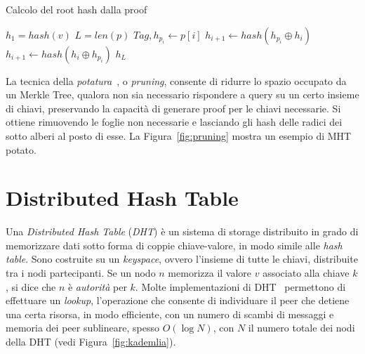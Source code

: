 \begin{algorithm}
	\caption{Calcolo del root hash dalla proof}
	\begin{algorithmic}
			\State $h_1 = hash(v)$
			\State $L = len(p)$
				\State $Tag, h_{p_i} \leftarrow p[i]$
					\State $h_{i+1} \leftarrow hash(h_{p_i} \oplus h_i)$	
				\Else
					\State $h_{i+1} \leftarrow hash(h_i \oplus h_{p_i})$				
				\EndIf
			\EndFor
			\Return $h_L$
		\EndProcedure
	\end{algorithmic}
	\label{alg:rh_proof}
\end{algorithm}

La tecnica della \emph{potatura}~\cite{ponnapalli2019scalable}, o \emph{pruning}, consente di ridurre lo spazio occupato da un Merkle Tree, qualora non sia necessario rispondere a query su un certo insieme di chiavi, preservando la capacità di generare proof per le chiavi necessarie. Si ottiene rimuovendo le foglie non necessarie e lasciando gli hash delle radici dei sotto alberi al posto di esse. La Figura~\ref{fig:pruning} mostra un esempio di MHT potato.

\section{Distributed Hash Table}

Una \textit{Distributed Hash Table} (\textit{DHT}) è un sistema di storage distribuito in grado di memorizzare dati sotto forma di coppie chiave-valore, in modo simile alle \emph{hash table}. Sono costruite su un \emph{keyspace}, ovvero l'insieme di tutte le chiavi, distribuite tra i nodi partecipanti. Se un nodo $n$ memorizza il valore $v$ associato alla chiave $k$, si dice che $n$ è \emph{autorità} per $k$. Molte implementazioni di DHT~\cite{maymounkov2002kademlia, ratnasamy2001scalable, stoica2001chord, zhao2004tapestry} permettono di effettuare un \emph{lookup}, l'operazione che consente di individuare il peer che detiene una certa risorsa, in modo efficiente, con un numero di scambi di messaggi e memoria dei peer sublineare, spesso $O(\log N)$, con $N$ il numero totale dei nodi della DHT (vedi Figura~\ref{fig:kademlia}).

